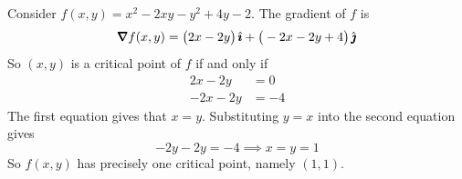 \begin{eg}[$f(x,y)= x^2-2xy-y^2+4y-2$]\label{eg maxminC}
Consider $f(x,y)= x^2-2xy-y^2+4y-2$. The gradient of $f$ is
\begin{equation*}
\vnabla f(x,y) = \big(2x-2y\big)\,\hi +\big(-2x-2y+4\big)\,\hj
\end{equation*}
So $(x,y)$ is a critical point of $f$ if and only if
\begin{align*}
2x-2y&=0 \\
-2x-2y&=-4
\end{align*}
The first equation gives that $x=y$.
Substituting $y=x$ into the second equation gives
\begin{equation*}
-2y-2y=-4\implies
x=y=1
\end{equation*}
So $f(x,y)$ has precisely one critical point, namely $(1,1)$.


\end{eg}
